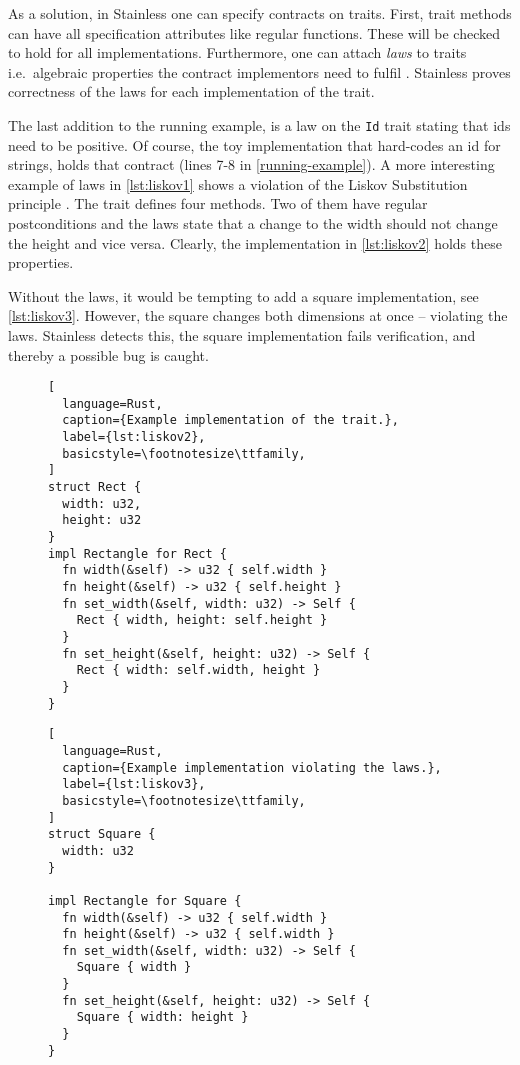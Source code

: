 As a solution, in Stainless one can specify contracts on traits. First, trait
methods can have all specification attributes like regular functions. These will
be checked to hold for all implementations. Furthermore, one can attach
\emph{laws} to traits i.e.~algebraic properties the contract implementors need
to fulfil \cite[section "Specifying Algebraic Properties"]{stainless-doc}.
Stainless proves correctness of the laws for each implementation of the trait.

The last addition to the running example, is a law on the \lstinline!Id! trait
stating  that ids need to be positive. Of course, the toy implementation that
hard-codes an id for strings, holds that contract (lines 7-8 in
\autoref{running-example}). A more interesting example of laws in
\autoref{lst:liskov1} shows a violation of the  Liskov Substitution principle
\cite{liskov}. The trait defines four methods. Two of them have regular
postconditions and the laws state that a change to the width should not change
the height and vice versa. Clearly, the implementation in \autoref{lst:liskov2}
holds these properties.

Without the laws, it would be tempting to add a square implementation, see
\autoref{lst:liskov3}. However, the square changes both dimensions at once --
violating the laws. Stainless detects this, the square implementation fails
verification, and thereby a possible bug is caught.

\begin{figure}[hbt]
\noindent \begin{minipage}[t]{.49\textwidth}
\begin{lstlisting}[
  language=Rust,
  caption={Example implementation of the trait.},
  label={lst:liskov2},
  basicstyle=\footnotesize\ttfamily,
]
struct Rect {
  width: u32,
  height: u32
}
impl Rectangle for Rect {
  fn width(&self) -> u32 { self.width }
  fn height(&self) -> u32 { self.height }
  fn set_width(&self, width: u32) -> Self {
    Rect { width, height: self.height }
  }
  fn set_height(&self, height: u32) -> Self {
    Rect { width: self.width, height }
  }
}
\end{lstlisting}
\end{minipage}\hfill
\begin{minipage}[t]{.49\textwidth}
\begin{lstlisting}[
  language=Rust,
  caption={Example implementation violating the laws.},
  label={lst:liskov3},
  basicstyle=\footnotesize\ttfamily,
]
struct Square {
  width: u32
}

impl Rectangle for Square {
  fn width(&self) -> u32 { self.width }
  fn height(&self) -> u32 { self.width }
  fn set_width(&self, width: u32) -> Self {
    Square { width }
  }
  fn set_height(&self, height: u32) -> Self {
    Square { width: height }
  }
}
\end{lstlisting}
\end{minipage}
\end{figure}

